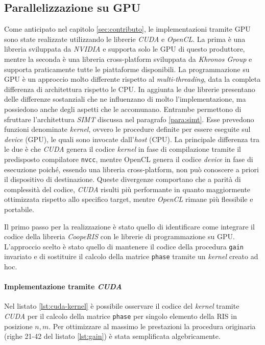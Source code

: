 \subsection{Parallelizzazione su GPU}
\label{subsec:cuda}

Come anticipato nel capitolo \ref{sec:contributo}, le implementazioni tramite
GPU sono state realizzate utilizzando le librerie \textit{CUDA}\cite{cuda} e
\textit{OpenCL}\cite{opencl}. La prima è una libreria sviluppata da \textit{NVIDIA}
e supporta solo le GPU di questo produttore, mentre la seconda è una libreria cross-platform
sviluppata da \textit{Khronos Group} e supporta praticamente tutte le
piattaforme disponibili. La programmazione su GPU è un approccio molto differente
rispetto al \textit{multi-threading}, data la completa differenza di architettura
rispetto le CPU. In aggiunta le due librerie presentano delle differenze
sostanziali che ne influenzano di molto l'implementazione, ma possiedono anche degli
aspetti che le accomunano. Entrambe permettono di sfruttare l'architettura
\textit{SIMT} discussa nel paragrafo \ref{para:simt}. Esse prevedono funzioni
denominate \textit{kernel}, ovvero le procedure definite per essere eseguite sul
\textit{device} (GPU), le quali sono invocate dall'\textit{host} (CPU). La
principale differenza tra le due è che \textit{CUDA} genera il codice \textit{kernel}
in fase di compilazione tramite il predisposto compilatore \texttt{nvcc}, mentre
OpenCL genera il codice \textit{device} in fase di esecuzione poiché, essendo
una libreria cross-platform, non può conoscere a priori il dispositivo di destinazione.
Queste divergenze comportano che a parità di complessità del codice, \textit{CUDA}
risulti più performante in quanto maggiormente ottimizzata rispetto allo
specifico target, mentre \textit{OpenCL} rimane più flessibile e portabile\cite{cudavsopencl}.

Il primo passo per la realizzazione è stato quello di identificare come integrare
il codice della libreria \textit{CoopeRIS} con le librerie di programmazione su
GPU. L'approccio scelto è stato quello di mantenere il codice della procedura \texttt{gain}
invariato e di sostituire il calcolo della matrice \texttt{phase} tramite un \textit{kernel}
creato ad hoc.

\paragraph{Implementazione tramite \textit{CUDA}}
\label{para:cuda}

Nel listato \ref{lst:cuda-kernel} è possibile osservare il codice del \textit{kernel}
tramite \textit{CUDA} per il calcolo della matrice \texttt{phase} per singolo elemento
della RIS in posizione $n, m$. Per ottimizzare al massimo le prestazioni la
procedura originaria (righe 21-42 del listato \ref{lst:gain}) è stata
semplificata algebricamente.

